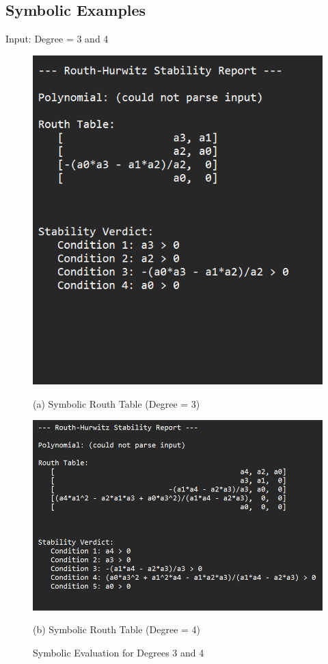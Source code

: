 \documentclass[11pt]{article}
\begin{document}
\subsection{Symbolic Examples}
Input: Degree = 3 and 4 \\

\begin{figure}[H]
  \centering
  \begin{minipage}[t]{0.40\textwidth}
    \centering
    \includegraphics[width=\textwidth]{routh_reportsym.png}
    \caption*{(a) Symbolic Routh Table (Degree = 3)}
  \end{minipage}
  \hfill
  \begin{minipage}[t]{0.40\textwidth}
    \centering
    \includegraphics[width=\textwidth]{routh_reportsym1.png}
    \caption*{(b) Symbolic Routh Table (Degree = 4)}
  \end{minipage}
  \caption{Symbolic Evaluation for Degrees 3 and 4}
  \label{fig:symbolic_examples}
\end{figure}
\end{document}

